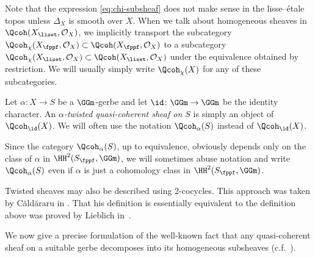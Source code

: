 \begin{remark}
\label{rem:def-Qcoh-chi}
Note that the expression
\eqref{eq:chi-subsheaf} does not make sense in the lisse--\'etale
topos unless $\Delta_X$ is smooth over $X$.
When we talk about homogeneous sheaves in $\Qcoh(X_\liset, \mathcal{O}_X)$,
we implicitly transport the subcategory
$\Qcoh_\chi(X_\fppf, \mathcal{O}_X) \subset \Qcoh(X_\fppf, \mathcal{O}_X)$
to a subcategory $\Qcoh_\chi(X_\liset, \mathcal{O}_X) \subset \Qcoh(X_\liset, \mathcal{O}_X)$
under the equivalence obtained by restriction.
We will usually simply write $\Qcoh_\chi(X)$ for any of these subcategories. 
\end{remark}

\begin{definition}
\label{def:twisted}
Let $\alpha\colon X \to S$ be a $\GGm$-gerbe and let $\id\colon \GGm \to \GGm$
be the identity character.
An \emph{$\alpha$-twisted quasi-coherent sheaf on $S$} is simply an object of $\Qcoh_\id(X)$.
We will often use the notation $\Qcoh_{\alpha}(S)$ instead
of $\Qcoh_\id(X)$.
\end{definition}

\begin{remark}
\label{rem-twisted-abuse}
Since the category $\Qcoh_{\alpha}(S)$, up to equivalence,
obviously depends only on the class of $\alpha$ in $\HH^2(S_\fppf, \GGm)$,
we will sometimes abuse notation and write $\Qcoh_{\alpha}(S)$
even if $\alpha$ is just a cohomology class in $\HH^2(S_\fppf, \GGm)$.
\end{remark}

\begin{remark}
\label{rem-twisted-2-cocycle}
Twisted sheaves may also be described using 2-cocycles.
This approach was taken by C{\u{a}}ld{\u{a}}raru in \cite[Definition~1.2.1]{caldararu2000}.
That his definition is essentially equivalent to the definition above was proved by
Lieblich in~\cite[Proposition~2.1.3.11]{lieblich2004}. 
\end{remark}

We now give a precise formulation of the well-known fact that
any quasi-coherent sheaf on a suitable gerbe
decomposes into its homogeneous subsheaves (c.f.~\cite[Proposition~2.2.1.6]{lieblich2004}).

